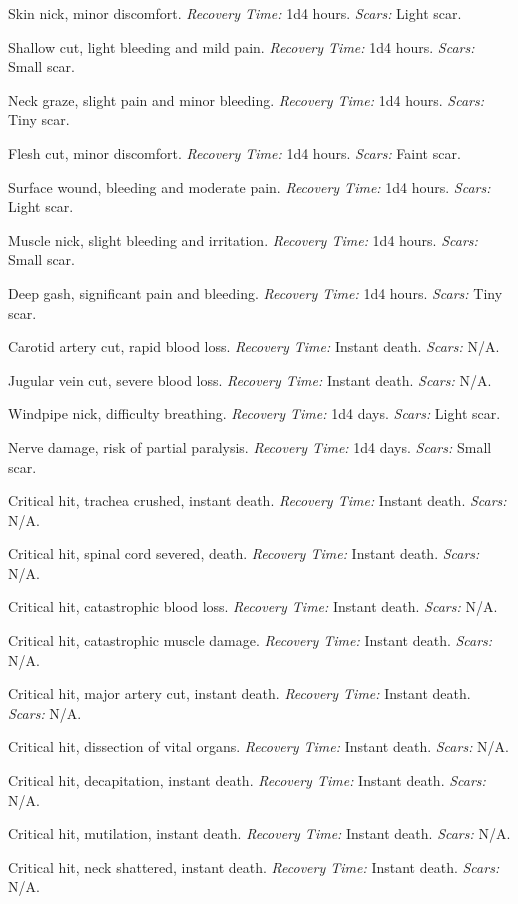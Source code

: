\documentclass[12pt]{book}
\begin{document}
\begin{description}[labelwidth=1.5em, leftmargin=*, itemsep=0.4em]
    \item[1 -] Skin nick, minor discomfort. \textit{Recovery Time:} 1d4 hours. \textit{Scars:} Light scar.
    \item[2 -] Shallow cut, light bleeding and mild pain. \textit{Recovery Time:} 1d4 hours. \textit{Scars:} Small scar.
    \item[3 -] Neck graze, slight pain and minor bleeding. \textit{Recovery Time:} 1d4 hours. \textit{Scars:} Tiny scar.
    \item[4 -] Flesh cut, minor discomfort. \textit{Recovery Time:} 1d4 hours. \textit{Scars:} Faint scar.
    \item[5 -] Surface wound, bleeding and moderate pain. \textit{Recovery Time:} 1d4 hours. \textit{Scars:} Light scar.
    \item[6 -] Muscle nick, slight bleeding and irritation. \textit{Recovery Time:} 1d4 hours. \textit{Scars:} Small scar.
    \item[7 -] Deep gash, significant pain and bleeding. \textit{Recovery Time:} 1d4 hours. \textit{Scars:} Tiny scar.
    \item[8 -] Carotid artery cut, rapid blood loss. \textit{Recovery Time:} Instant death. \textit{Scars:} N/A.
    \item[9 -] Jugular vein cut, severe blood loss. \textit{Recovery Time:} Instant death. \textit{Scars:} N/A.
    \item[10 -] Windpipe nick, difficulty breathing. \textit{Recovery Time:} 1d4 days. \textit{Scars:} Light scar.
    \item[11 -] Nerve damage, risk of partial paralysis. \textit{Recovery Time:} 1d4 days. \textit{Scars:} Small scar.
    \item[12 -] Critical hit, trachea crushed, instant death. \textit{Recovery Time:} Instant death. \textit{Scars:} N/A.
    \item[13 -] Critical hit, spinal cord severed, death. \textit{Recovery Time:} Instant death. \textit{Scars:} N/A.
    \item[14 -] Critical hit, catastrophic blood loss. \textit{Recovery Time:} Instant death. \textit{Scars:} N/A.
    \item[15 -] Critical hit, catastrophic muscle damage. \textit{Recovery Time:} Instant death. \textit{Scars:} N/A.
    \item[16 -] Critical hit, major artery cut, instant death. \textit{Recovery Time:} Instant death. \textit{Scars:} N/A.
    \item[17 -] Critical hit, dissection of vital organs. \textit{Recovery Time:} Instant death. \textit{Scars:} N/A.
    \item[18 -] Critical hit, decapitation, instant death. \textit{Recovery Time:} Instant death. \textit{Scars:} N/A.
    \item[19 -] Critical hit, mutilation, instant death. \textit{Recovery Time:} Instant death. \textit{Scars:} N/A.
    \item[20 -] Critical hit, neck shattered, instant death. \textit{Recovery Time:} Instant death. \textit{Scars:} N/A.
\end{description}
\end{document}
